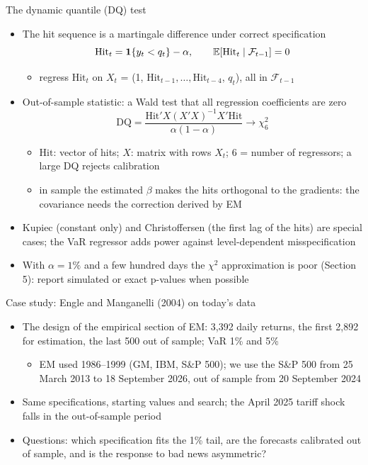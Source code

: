 \begin{frame}{The dynamic quantile (DQ) test}
\itemsize{\footnotesize}
\begin{itemize}
    \item The hit sequence is a martingale difference under correct specification
    \[ \mathrm{Hit}_t = \mathbf 1\{y_t < q_t\} - \alpha, \qquad \mathbb{E}[\mathrm{Hit}_t \mid \mathcal F_{t-1}] = 0 \]
    \begin{itemize}
        \item regress $\mathrm{Hit}_t$ on $X_t$ = (1, $\mathrm{Hit}_{t-1}, \dots, \mathrm{Hit}_{t-4}$, $q_t$), all in $\mathcal F_{t-1}$ 
    \end{itemize}
    \item Out-of-sample statistic: a Wald test that all regression coefficients are zero
    \[ \mathrm{DQ} = \frac{\mathrm{Hit}'X(X'X)^{-1}X'\mathrm{Hit}}{\alpha(1 - \alpha)} \to \chi^2_6 \]
    \begin{itemize}
        \item $\mathrm{Hit}$: vector of hits; $X$: matrix with rows $X_t$; 6 = number of regressors; a large DQ rejects calibration
        \item in sample the estimated $\beta$ makes the hits orthogonal to the gradients: the covariance needs the correction derived by EM
    \end{itemize}
    \item Kupiec (constant only) and Christoffersen (the first lag of the hits) are special cases; the VaR regressor adds power against level-dependent misspecification
    \item With $\alpha = 1\%$ and a few hundred days the $\chi^2$ approximation is poor (Section 5): report simulated or exact p-values when possible
\end{itemize}
\end{frame}

\begin{frame}{Case study: Engle and Manganelli (2004) on today's data}
\itemsize{\small}
\begin{itemize}
    \item The design of the empirical section of EM: 3,392 daily returns, the first 2,892 for estimation, the last 500 out of sample; VaR 1\% and 5\%
    \begin{itemize}
        \item EM used 1986--1999 (GM, IBM, S\&P 500); we use the S\&P 500 from 25 March 2013 to 18 September 2026, out of sample from 20 September 2024
    \end{itemize}
    \item Same specifications, starting values and search; the April 2025 tariff shock falls in the out-of-sample period
    \item Questions: which specification fits the 1\% tail, are the forecasts calibrated out of sample, and is the response to bad news asymmetric?
\end{itemize}
\end{frame}

